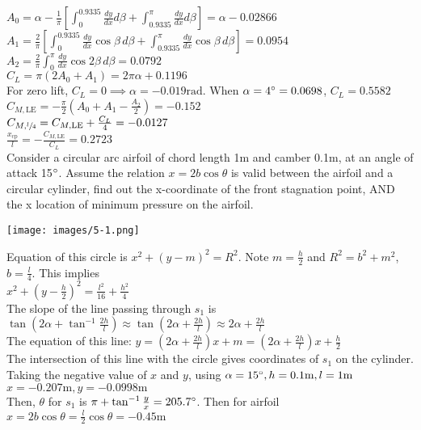 \documentclass[12pt, twocolumn, letterpaper]{article}
\begin{document}
$A_0=\alpha-\frac{1}{\pi}\left[\int_0^{0.9335}\frac{dy}{dx}d\beta+\int_{0.9335}^\pi\frac{dy}{dx}d\beta\right]=\alpha-0.02866$\\
$A_1=\frac{2}{\pi}\left[\int_0^{0.9335}\frac{dy}{dx}\cos\beta\,d\beta+\int_{0.9335}^\pi\frac{dy}{dx}\cos\beta\,d\beta\right]=0.0954$\\
$A_2=\frac{2}{\pi}\int_0^\pi\frac{dy}{dx}\cos2\beta\,d\beta=0.0792$\\
$C_L=\pi(2A_0+A_1)=2\pi\alpha+0.1196$\\
For zero lift, $C_L=0\implies\alpha=-0.019\text{rad}$.
When $\alpha=4\degree=0.0698$, $C_L=0.5582$\\
$C_{M,\text{LE}}=-\frac{\pi}{2}\left(A_0+A_1-\frac{A_2}{2}\right)=-0.152$\\
$C_{M,\sfrac{l}{4}}=C_{M,\text{LE}}+\frac{C_L}{4}=-0.0127$\\
$\frac{x_\text{cp}}{l}=-\frac{C_{M,\text{LE}}}{C_L}=0.2723$\\
\hline
Consider a circular arc airfoil of chord length 1m and camber 0.1m, at an angle of attack 15$\degree$. Assume the relation $x=2b\cos\theta$ is valid between the airfoil and a circular cylinder, find out the x-coordinate of the front stagnation point, AND the x location of minimum pressure on the airfoil.\\
\begin{center}
    \texttt{[image: images/5-1.png]}
\end{center}
Equation of this circle is $x^2+(y-m)^2=R^2$. Note $m=\frac{h}{2}$ and $R^2=b^2+m^2$, $b=\frac{l}{4}$. This implies\\
$x^2+\left(y-\frac{h}{2}\right)^2=\frac{l^2}{16}+\frac{h^2}{4}$\\
The slope of the line passing through $s_1$ is $\tan\left(2\alpha+\tan^{-1}\frac{2h}{l}\right)\approx\tan\left(2\alpha+\frac{2h}{l}\right)\approx2\alpha+\frac{2h}{l}$\\
The equation of this line: $y=\left(2\alpha+\frac{2h}{l}\right)x+m=\left(2\alpha+\frac{2h}{l}\right)x+\frac{h}{2}$\\
The intersection of this line with the circle gives coordinates of $s_1$ on the cylinder. Taking the negative value of $x$ and $y$, using $\alpha=15\degree, h=0.1\text{m}, l=1\text{m}$\\
$x=-0.207\text{m}, y=-0.0998\text{m}$\\
Then, $\theta$ for $s_1$ is $\pi+\tan^{-1}\frac{y}{x}=205.7\degree$. Then for airfoil\\
$x=2b\cos\theta=\frac{l}{2}\cos\theta=-0.45\text{m}$\\
\end{document}
